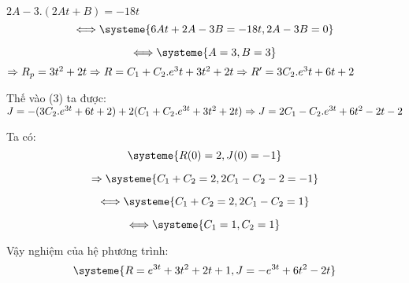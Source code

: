     $2A-3.(2At+B)=-18t$ \\

    \begin{equation}
        \Longleftrightarrow
        \systeme{
            6At+2A-3B=-18t,
            2A - 3B = 0
        }\label{eq:equation2}
    \end{equation}

    \begin{equation}
        \Longleftrightarrow
        \systeme{
            A = 3,
            B = 3
        }\label{eq:equation2}
    \end{equation}
    $\Rightarrow R_p=3t^2+2t \\
    \Rightarrow R=C_1+C_2.e^3t+3t^2+2t \\
    \Rightarrow R'=3C_2.e^3t+6t+2 \\$

    Thế vào (3) ta được: \\

    $J=-(3C_2.e^{3t}+6t+2)+2(C_1+C_2.e^{3t}+3t^2+2t) \\
    \Rightarrow J=2C_1-C_2.e^{3t}+6t^2-2t-2
    $

    Ta có: \\

    \begin{equation}
        \systeme{
            R(0) = 2,
            J(0) = -1
        }\label{eq:equation2}
    \end{equation}

    \begin{equation}
        \Rightarrow
        \systeme{
            C_1 + C_2 = 2,
            2C_1 - C_2 -2 = -1
        }\label{eq:equation2}
    \end{equation}

    \begin{equation}
        \Longleftrightarrow
        \systeme{
            C_1 + C_2 = 2,
            2C_1 - C_2 =1
        }\label{eq:equation2}
    \end{equation}

    \begin{equation}
        \Longleftrightarrow
        \systeme{
            C_1 = 1,
            C_2 = 1
        }\label{eq:equation2}
    \end{equation}

    Vậy nghiệm của hệ phương trình:
    \begin{equation}
        \systeme{
            R = e^{3t}+3t^2+2t+1,
            J = -e^{3t}+6t^2-2t
        }\label{eq:equation2}
    \end{equation}

